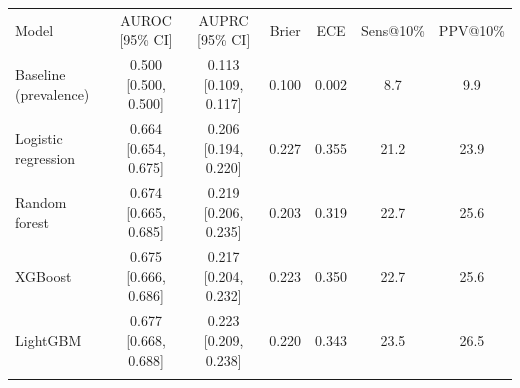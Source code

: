 \begin{tabular}{lcccccc}
\hline\noalign{\smallskip}
Model & AUROC [95\% CI] & AUPRC [95\% CI] & Brier & ECE & Sens@10\% & PPV@10\% \\
\noalign{\smallskip}\hline\noalign{\smallskip}
Baseline (prevalence) & 0.500 [0.500, 0.500] & 0.113 [0.109, 0.117] & 0.100 & 0.002 & 8.7 & 9.9 \\
Logistic regression & 0.664 [0.654, 0.675] & 0.206 [0.194, 0.220] & 0.227 & 0.355 & 21.2 & 23.9 \\
Random forest & 0.674 [0.665, 0.685] & 0.219 [0.206, 0.235] & 0.203 & 0.319 & 22.7 & 25.6 \\
XGBoost & 0.675 [0.666, 0.686] & 0.217 [0.204, 0.232] & 0.223 & 0.350 & 22.7 & 25.6 \\
LightGBM & 0.677 [0.668, 0.688] & 0.223 [0.209, 0.238] & 0.220 & 0.343 & 23.5 & 26.5 \\
\noalign{\smallskip}\hline
\end{tabular}
